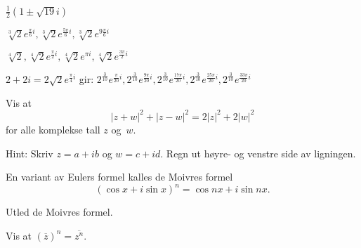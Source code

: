 \begin{losning}
\begin{punkt}
$\frac{1}{2}(1\pm \sqrt{19}i)$ 
\end{punkt}
\begin{punkt}
$\sqrt[3]{2} e^{\frac{\pi}{6} i},\sqrt[3]{2} e^{\frac{5\pi}{6} i},\sqrt[3]{2} e^{9\frac{\pi}{6} i} $
\end{punkt}
\begin{punkt}
$\sqrt[4]{2},\sqrt[4]{2} e^{\frac{\pi}{2} i},\sqrt[4]{2} e^{\pi i},\sqrt[4]{2} e^{\frac{3\pi}{2} i}$
\end{punkt}
\begin{punkt}
$2+2i=2\sqrt{2}e^{\frac{\pi}{4}i}$ gir:
$2^{\frac{3}{10}} e^{\frac{\pi}{20} i},2^{\frac{3}{10}} e^{\frac{9\pi}{20} i},2^{\frac{3}{10}} e^{\frac{17\pi}{20} i},2^{\frac{3}{10}} e^{\frac{25\pi}{20} i},2^{\frac{3}{10}} e^{\frac{33\pi}{20} i}$
\end{punkt}
\end{losning}



\begin{oppgave}
Vis at 
\[
|z+w|^2+|z-w|^2=2|z|^2+2|w|^2
\]
for alle komplekse tall $z$ og~$w$.
\end{oppgave}

\begin{losning}
Hint: Skriv $z=a+ib$ og $w=c+id$. Regn ut høyre- og venstre side av ligningen. 
\end{losning}

\begin{oppgave}
En variant av Eulers formel kalles de Moivres formel
\[
(\cos x + i\sin x)^n=\cos nx + i\sin nx.
\]
\begin{punkt}
Utled de Moivres formel.
\end{punkt}

\begin{punkt}
Vis at $(\overline z)^n=\overline{z^n}$.
\end{punkt}
\end{oppgave}


